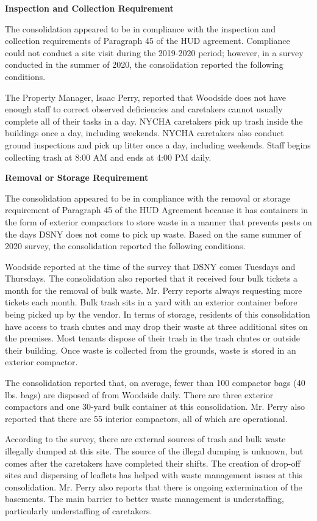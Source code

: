 

\textbf{Inspection and Collection Requirement}

The consolidation appeared to be in compliance with the inspection and collection requirements of Paragraph 45 of the HUD agreement. Compliance could not conduct a site visit during the 2019-2020 period; however, in a survey conducted in the summer of 2020, the consolidation reported the following conditions.

The Property Manager, Isaac Perry, reported that Woodside does not have enough staff to correct observed deficiencies and caretakers cannot usually complete all of their tasks in a day. NYCHA caretakers pick up trash inside the buildings once a day, including weekends. NYCHA caretakers also conduct ground inspections and pick up litter once a day, including weekends. Staff begins collecting trash at 8:00 AM and ends at 4:00 PM daily.

\textbf{Removal or Storage Requirement}

The consolidation appeared to be in compliance with the  removal or storage requirement of Paragraph  45 of the HUD Agreement because it has containers in the form of exterior compactors to store waste in a manner that prevents pests on the days DSNY does not come to pick up waste. Based on the same summer of  2020 survey, the consolidation reported the following conditions.

Woodside reported at the time of the survey that DSNY comes Tuesdays and Thursdays. The consolidation also reported that it received four bulk tickets a month for the removal of bulk waste. Mr. Perry reports always requesting more tickets each month. Bulk trash sits in a yard with an exterior container before being picked up by the vendor. In terms of storage, residents of this consolidation have access to trash chutes and may drop their waste at three additional sites on the premises. Most tenants dispose of their trash in the trash chutes or outside their building. Once waste is collected from the grounds, waste is stored in an exterior compactor. 

The consolidation reported that, on average, fewer than 100 compactor bags (40 lbs. bags) are disposed of from Woodside daily. There are three exterior compactors  and one 30-yard bulk container at this consolidation. Mr. Perry also reported that there are 55 interior compactors, all of which are operational.

According to the survey, there are external sources of trash and bulk waste illegally dumped at this site. The source of the illegal dumping is unknown, but comes after the caretakers have completed their shifts. The creation of drop-off sites and dispersing of leaflets has helped with waste management issues at this consolidation. Mr. Perry also reports that there is ongoing extermination of the basements. The main barrier to better waste management is understaffing, particularly understaffing of caretakers.